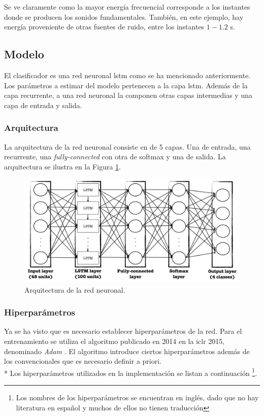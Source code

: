 \indent Se ve claramente como la mayor energía frecuencial corresponde a los instantes donde se producen los sonidos
fundamentales.
También, en este ejemplo, hay energía proveniente de otras fuentes de ruido, entre los instantes $1-1.2$ s.

\subsection{Modelo} \label{subsec:model}

\indent El clasificador es una red neuronal \acrshort{lstm} como se ha mencionado anteriormente. Los parámetros a
estimar del modelo pertenecen a la capa \acrshort{lstm}.
Además de la capa recurrente, a una red neuronal la componen otras capas intermedias y una capa de entrada y salida.

\subsubsection{Arquitectura}

\indent La arquitectura de la red neuronal consiste en de 5 capas. Una de entrada, una recurrente, una
\textit{fully-connected} con otra de softmax y una de salida. La arquitectura se ilustra en la Figura
\ref{fig:nn-architecture}.

\begin{figure}[H]
  \centering
  \includegraphics[scale=0.35]{chapters/chapter-07/images/lstm-architecture.png}
  \caption[Arquitectura de la red neuronal]{Arquitectura de la red neuronal.}
  \label{fig:nn-architecture}
\end{figure}

\subsubsection{Hiperparámetros}

\indent Ya se ha visto que es necesario establecer hiperparámetros de la red. Para el entrenamiento se utiliza el
algoritmo publicado en 2014 en la \acrshort{iclr} 2015, denominado \textit{Adam} \cite{pp:adam}. El algoritmo
introduce ciertos hiperparámetros además de los convencionales que es necesario definir a priori. \\*
\indent Los hiperparámetros utilizados en la implementación se listan a continuación \footnote{Los nombres de los
hiperparámetros se encuentran en inglés, dado que no hay literatura en español y muchos de ellos no tienen
traducción}.

